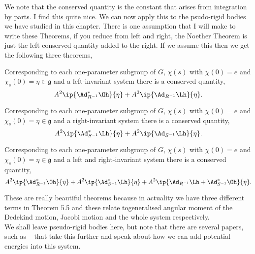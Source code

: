 \noindent
We note that the conserved quantity is the constant that arises from integration by parts. I find this quite nice. We can now apply this to the psudo-rigid bodies we have studied in this chapter. There is one assumption that I will make to write these Theorems, if you reduce from left and right, the Noether Theorem is just the left conserved quantity added to the right. If we assume this then we get the following three theorems,
\begin{nthm}
  Corresponding to each one-parameter subgroup of $G$, $\chi(s)$ with $\chi(0) = e$ and $\chi_s(0) = \eta \in \mathfrak{g}$ and a left-invariant system there is a conserved quantity,
  $$ A^2\ip{\Ad_{R^{-1}}^* \Oh}{\eta} + A^2\ip{\Ad_{R^{-1}}\Lh}{\eta}. $$
\end{nthm}
\begin{nthm}
  Corresponding to each one-parameter subgroup of $G$, $\chi(s)$ with $\chi(0) = e$ and $\chi_s(0) = \eta \in \mathfrak{g}$ and a right-invariant system there is a conserved quantity,
  $$ A^2\ip{\Ad_{S^{-1}}^* \Lh}{\eta} + A^2\ip{\Ad_{S^{-1}}\Lh}{\eta}. $$
\end{nthm}
\begin{nthm}
  Corresponding to each one-parameter subgroup of $G$, $\chi(s)$ with $\chi(0) = e$ and $\chi_s(0) = \eta \in \mathfrak{g}$ and a left and right-invariant system there is a conserved quantity,
  $$ A^2\ip{\Ad_{R^{-1}}^* \Oh}{\eta} + A^2\ip{\Ad_{S^{-1}}^* \Lh}{\eta} + A^2\ip{\Ad_{R^{-1}}\Lh + \Ad_{S^{-1}}^*\Oh }{\eta}. $$
\end{nthm}
\noindent
These are really beautiful theorems because in actuality we have three different terms in Theorem 5.5 and these relate togeneralised angular moment of the Dedekind motion, Jacobi motion and the whole system respectively.\\

\noindent
We shall leave pseudo-rigid bodies here, but note that there are several papers, such as ~\cite{Iwai_2010} that take this further and speak about how we can add potential energies into this system.